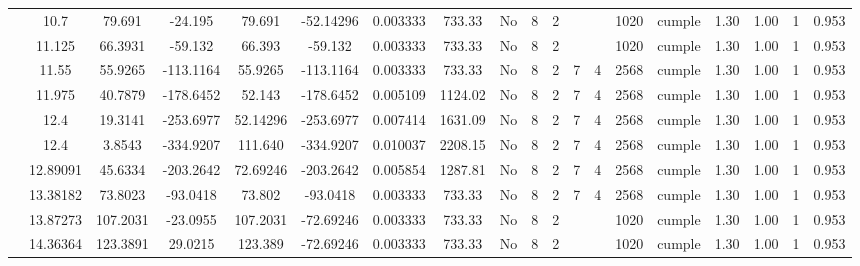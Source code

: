 \begin{table}[H]
{\begin{tabular}{|c|c|c|c|c|c|r|c|c|c|c|c|c|c|c|c|c|c|c|}
\cline{2-19}        & 10.7 & 79.691 & -24.195 & 79.691 & -52.14296 & 0.003333 & 733.33 & No  & 8   & 2   &     &     & 1020 & \cellcolor[rgb]{ .776,  .937,  .808}cumple & 1.30 & 1.00 & 1   & 0.953 \bigstrut\\
\cline{2-19}        & 11.125 & 66.3931 & -59.132 & 66.393 & -59.132 & 0.003333 & 733.33 & No  & 8   & 2   &     &     & 1020 & \cellcolor[rgb]{ .776,  .937,  .808}cumple & 1.30 & 1.00 & 1   & 0.953 \bigstrut\\
\cline{2-19}        & 11.55 & 55.9265 & -113.1164 & 55.9265 & -113.1164 & 0.003333 & 733.33 & No  & 8   & 2   & 7   & 4   & 2568 & \cellcolor[rgb]{ .776,  .937,  .808}cumple & 1.30 & 1.00 & 1   & 0.953 \bigstrut\\
\cline{2-19}        & 11.975 & 40.7879 & -178.6452 & 52.143 & -178.6452 & 0.005109 & 1124.02 & No  & 8   & 2   & 7   & 4   & 2568 & \cellcolor[rgb]{ .776,  .937,  .808}cumple & 1.30 & 1.00 & 1   & 0.953 \bigstrut\\
\cline{2-19}        & \cellcolor[rgb]{ .851,  .882,  .949}12.4 & 19.3141 & -253.6977 & 52.14296 & -253.6977 & 0.007414 & 1631.09 & No  & 8   & 2   & 7   & 4   & 2568 & \cellcolor[rgb]{ .776,  .937,  .808}cumple & 1.30 & 1.00 & 1   & 0.953 \bigstrut\\
\cline{2-19}        & \cellcolor[rgb]{ .851,  .882,  .949}12.4 & 3.8543 & -334.9207 & 111.640 & -334.9207 & 0.010037 & 2208.15 & No  & 8   & 2   & 7   & 4   & 2568 & \cellcolor[rgb]{ .776,  .937,  .808}cumple & 1.30 & 1.00 & 1   & 0.953 \bigstrut\\
\cline{2-19}        & 12.89091 & 45.6334 & -203.2642 & 72.69246 & -203.2642 & 0.005854 & 1287.81 & No  & 8   & 2   & 7   & 4   & 2568 & \cellcolor[rgb]{ .776,  .937,  .808}cumple & 1.30 & 1.00 & 1   & 0.953 \bigstrut\\
\cline{2-19}        & 13.38182 & 73.8023 & -93.0418 & 73.802 & -93.0418 & 0.003333 & 733.33 & No  & 8   & 2   & 7   & 4   & 2568 & \cellcolor[rgb]{ .776,  .937,  .808}cumple & 1.30 & 1.00 & 1   & 0.953 \bigstrut\\
\cline{2-19}        & 13.87273 & 107.2031 & -23.0955 & 107.2031 & -72.69246 & 0.003333 & 733.33 & No  & 8   & 2   &     &     & 1020 & \cellcolor[rgb]{ .776,  .937,  .808}cumple & 1.30 & 1.00 & 1   & 0.953 \bigstrut\\
\cline{2-19}        & 14.36364 & 123.3891 & 29.0215 & 123.389 & -72.69246 & 0.003333 & 733.33 & No  & 8   & 2   &     &     & 1020 & \cellcolor[rgb]{ .776,  .937,  .808}cumple & 1.30 & 1.00 & 1   & 0.953 \bigstrut\\

\end{tabular}}
\end{table}
